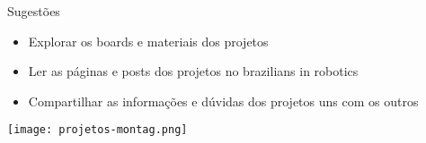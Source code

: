 \begin{frame}[c]{} 
   
    \begin{center}
    \end{center}
       
\end{frame}
%
\begin{frame}[t]{Sugestões} 

    
    \vspace*{0.3cm}
    \begin{itemize}
        \item Explorar os boards e materiais dos projetos
        \item Ler as páginas e posts dos projetos no brazilians in robotics
        \item Compartilhar as informações e dúvidas dos projetos uns com os outros
    \end{itemize}
    \vspace*{0.8cm}
    \texttt{[image: projetos-montag.png]}
\end{frame}
